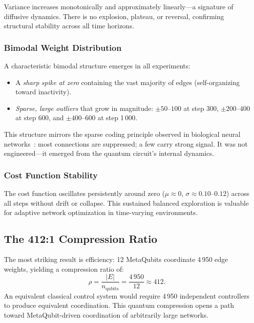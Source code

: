 \documentclass[twocolumn,amsmath,amssymb,prl]{revtex4-2}
\begin{document}
Variance increases monotonically and approximately linearly—a signature of
diffusive dynamics.  There is no explosion, plateau, or reversal, confirming
structural stability across all time horizons.

\subsubsection{Bimodal Weight Distribution}

A characteristic bimodal structure emerges in all experiments:
\begin{itemize}
  \item A \emph{sharp spike at zero} containing the vast majority of edges
        (self-organizing toward inactivity).
  \item \emph{Sparse, large outliers} that grow in magnitude: $\pm 50$--$100$
        at step 300, $\pm 200$--$400$ at step 600, and $\pm 400$--$600$ at
        step 1\,000.
\end{itemize}
This structure mirrors the sparse coding principle observed in biological neural
networks~\cite{Olshausen1997}: most connections are suppressed; a few carry
strong signal.  It was not engineered—it emerged from the quantum circuit's
internal dynamics.

\subsubsection{Cost Function Stability}

The cost function oscillates persistently around zero ($\mu \approx 0$,
$\sigma \approx 0.10$--$0.12$) across all steps without drift or collapse.
This sustained balanced exploration is valuable for adaptive network
optimization in time-varying environments.

\subsection{The 412:1 Compression Ratio}

The most striking result is efficiency: 12 MetaQubits coordinate 4\,950
edge weights, yielding a compression ratio of:
\begin{equation}
  \rho = \frac{|E|}{n_{\mathrm{qubits}}} = \frac{4\,950}{12} \approx 412.
\end{equation}
An equivalent classical control system would require 4\,950 independent
controllers to produce equivalent coordination.  This quantum compression opens
a path toward MetaQubit-driven coordination of arbitrarily large networks.
\end{document}

